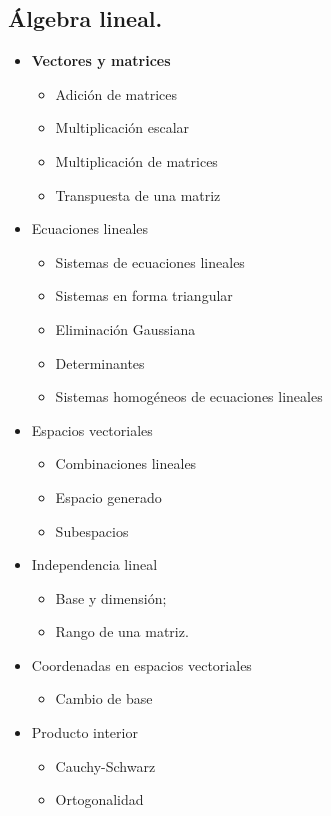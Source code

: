 \documentclass[10pt,a4paper]{book}
\begin{document}
\subsection{Álgebra lineal.}
\begin{itemize}
	\item \textbf{Vectores y matrices}
	\begin{itemize}
		\item Adición de matrices 
		\item Multiplicación escalar
		\item Multiplicación de matrices
		\item Transpuesta de una matriz
	\end{itemize}		
	
	\item Ecuaciones lineales
	\begin{itemize}
		\item Sistemas de ecuaciones lineales
		\item Sistemas en forma triangular
		\item Eliminación Gaussiana
		\item Determinantes
		\item Sistemas homogéneos de ecuaciones lineales
	\end{itemize}
	\item Espacios vectoriales
	\begin{itemize}
		\item Combinaciones lineales
		\item Espacio generado
		\item Subespacios
	\end{itemize}		
	\item Independencia lineal
	\begin{itemize}
		\item Base y dimensión; 
		\item Rango de una matriz.
	\end{itemize}		
	\item Coordenadas en espacios vectoriales
	\begin{itemize}
		\item Cambio de base
	\end{itemize} 
	\item Producto interior
	\begin{itemize}
		\item Cauchy-Schwarz 
		\item Ortogonalidad
	\end{itemize}	   
\end{itemize}
\end{document}
